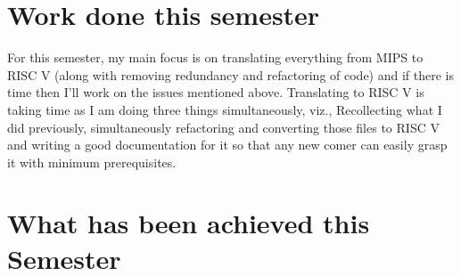 \section{Work done this semester}

For this semester, my main focus is on translating everything from MIPS to RISC V (along with removing redundancy and refactoring of code) and if there is time then I'll work on the issues mentioned above. Translating to RISC V is taking time as I am doing three things simultaneously, viz., Recollecting what I did previously, simultaneously refactoring and converting those files to RISC V and writing a good documentation for it so that any new comer can easily grasp it with minimum prerequisites. 

\section{What has been achieved this Semester}

